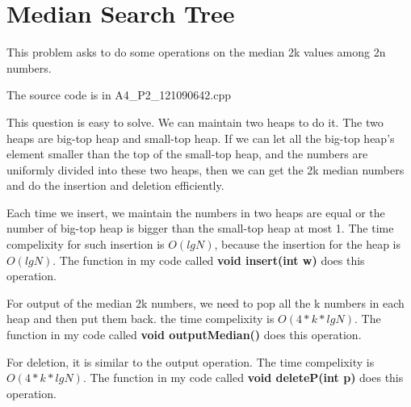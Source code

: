 
\section{Median Search Tree}
This problem asks to do some operations on the median 2k values among 2n numbers. 

The source code is in A4\_P2\_121090642.cpp

This question is easy to solve. We can maintain two heaps to do it. The two heaps are big-top heap and small-top heap. If we can let all the big-top heap's element smaller than the top of the small-top heap, and the numbers are uniformly divided into these two heaps, then we can get the 2k median numbers and do the insertion and deletion efficiently.

Each time we insert, we maintain the numbers in two heaps are equal or the number of big-top heap is bigger than the small-top heap at most 1. The time compelixity for such insertion is $O(lgN)$, because the insertion for the heap is $O(lgN)$. The function in my code called \textbf{void insert(int w)} does this operation.

For output of the median 2k numbers, we need to pop all the k numbers in each heap and then put them back. the time compelixity is $O(4*k*lgN)$. The function in my code called \textbf{void outputMedian()} does this operation.

For deletion, it is similar to the output operation. The time compelixity is $O(4*k*lgN)$. The function in my code called \textbf{void deleteP(int p)} does this operation.